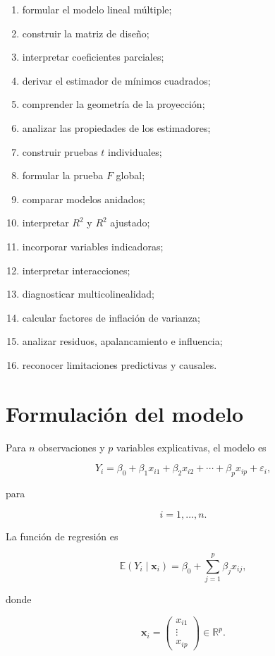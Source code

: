 \documentclass[
  spanish,
  11pt,
  letterpaper,
  DIV=11,
  numbers=noendperiod]{scrreprt}
\providecommand{\tightlist}{%
  \setlength{\itemsep}{0pt}\setlength{\parskip}{0pt}}
\theoremstyle{definition}
\theoremstyle{plain}
\theoremstyle{definition}
\theoremstyle{remark}
\begin{document}
\begin{enumerate}
\def\labelenumi{\arabic{enumi}.}
\tightlist
\item
  formular el modelo lineal múltiple;
\item
  construir la matriz de diseño;
\item
  interpretar coeficientes parciales;
\item
  derivar el estimador de mínimos cuadrados;
\item
  comprender la geometría de la proyección;
\item
  analizar las propiedades de los estimadores;
\item
  construir pruebas \(t\) individuales;
\item
  formular la prueba \(F\) global;
\item
  comparar modelos anidados;
\item
  interpretar \(R^2\) y \(R^2\) ajustado;
\item
  incorporar variables indicadoras;
\item
  interpretar interacciones;
\item
  diagnosticar multicolinealidad;
\item
  calcular factores de inflación de varianza;
\item
  analizar residuos, apalancamiento e influencia;
\item
  reconocer limitaciones predictivas y causales.
\end{enumerate}

\section{Formulación del modelo}\label{formulaciuxf3n-del-modelo-1}

Para \(n\) observaciones y \(p\) variables explicativas, el modelo es

\[
Y_i
=
\beta_0
+
\beta_1 x_{i1}
+
\beta_2 x_{i2}
+
\cdots
+
\beta_p x_{ip}
+
\varepsilon_i,
\]

para

\[
i=1,\ldots,n.
\]

La función de regresión es

\[
\mathbb{E}(Y_i\mid\mathbf{x}_i)
=
\beta_0
+
\sum_{j=1}^{p}
\beta_j x_{ij},
\]

donde

\[
\mathbf{x}_i
=
\begin{pmatrix}
x_{i1}\\
\vdots\\
x_{ip}
\end{pmatrix}
\in\mathbb{R}^{p}.
\]
\end{document}
